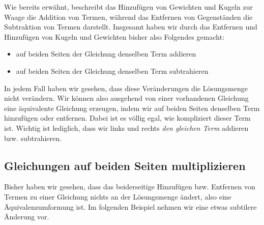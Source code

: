 \documentclass[../../main.tex]{subfiles}
\begin{document}
Wie bereits erwähnt, beschreibt das Hinzufügen von Gewichten und Kugeln zur Waage die Addition von Termen, während das Entfernen von Gegenständen die Subtraktion von Termen darstellt. Insgesamt haben wir durch das Entfernen und Hinzufügen von Kugeln und Gewichten bisher also Folgendes gemacht:
\begin{itemize}
    \item auf beiden Seiten der Gleichung denselben Term addieren
    \item auf beiden Seiten der Gleichung denselben Term subtrahieren
\end{itemize}

In jedem Fall haben wir gesehen, dass diese Veränderungen die Lösungsmenge nicht verändern. Wir können also ausgehend von einer vorhandenen Gleichung eine äquivalente Gleichung erzeugen, indem wir auf beiden Seiten denselben Term hinzufügen oder entfernen. Dabei ist es völlig egal, wie kompliziert dieser Term ist. Wichtig ist lediglich, dass wir links und rechts \emph{den gleichen Term} addieren bzw. subtrahieren.

\subsection{Gleichungen auf beiden Seiten multiplizieren}

Bisher haben wir gesehen, dass das beiderseitige Hinzufügen bzw. Entfernen von Termen zu einer Gleichung nichts an der Lösungsmenge ändert, also eine Äquivalenzumformung ist. Im folgenden Beispiel nehmen wir eine etwas subtilere Änderung vor.
\end{document}
